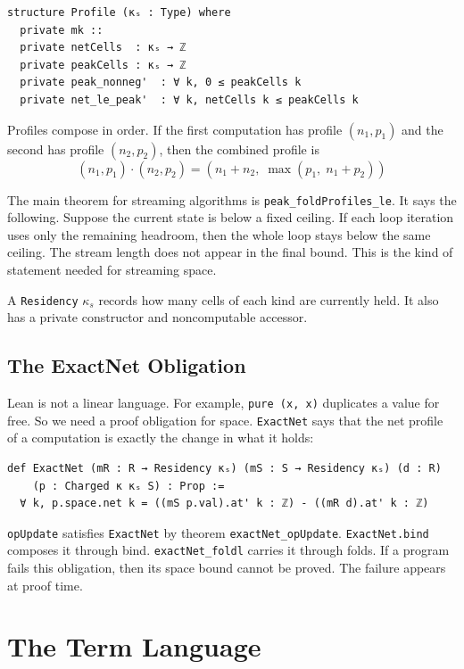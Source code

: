 \documentclass[acmsmall,nonacm]{acmart}
\begin{document}
\begin{lstlisting}
structure Profile (κₛ : Type) where
  private mk ::
  private netCells  : κₛ → ℤ
  private peakCells : κₛ → ℤ
  private peak_nonneg'  : ∀ k, 0 ≤ peakCells k
  private net_le_peak'  : ∀ k, netCells k ≤ peakCells k
\end{lstlisting}

Profiles compose in order.
If the first computation has profile $(n_1,p_1)$ and the second has profile $(n_2,p_2)$, then the combined profile is
\[
(n_1, p_1) \cdot (n_2, p_2) = (n_1 + n_2,\; \max(p_1,\; n_1 + p_2))
\]

The main theorem for streaming algorithms is \lstinline{peak_foldProfiles_le}.
It says the following.
Suppose the current state is below a fixed ceiling.
If each loop iteration uses only the remaining headroom, then the whole loop stays below the same ceiling.
The stream length does not appear in the final bound.
This is the kind of statement needed for streaming space.

A \lstinline{Residency} $\kappa_s$ records how many cells of each kind are currently held.
It also has a private constructor and noncomputable accessor.

\subsection{The ExactNet Obligation}\label{sec:exactnet}

Lean is not a linear language.
For example, \lstinline{pure (x, x)} duplicates a value for free.
So we need a proof obligation for space.
\lstinline{ExactNet} says that the net profile of a computation is exactly the change in what it holds:

\begin{lstlisting}
def ExactNet (mR : R → Residency κₛ) (mS : S → Residency κₛ) (d : R)
    (p : Charged κ κₛ S) : Prop :=
  ∀ k, p.space.net k = ((mS p.val).at' k : ℤ) - ((mR d).at' k : ℤ)
\end{lstlisting}

\lstinline{opUpdate} satisfies \lstinline{ExactNet} by theorem \lstinline{exactNet_opUpdate}.
\lstinline{ExactNet.bind} composes it through bind.
\lstinline{exactNet_foldl} carries it through folds.
If a program fails this obligation, then its space bound cannot be proved.
The failure appears at proof time.


\section{The Term Language}\label{sec:term-language}
\end{document}

